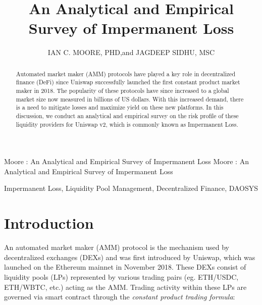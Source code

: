 \documentclass[journal,twocolumn,12pt]{ieeesyscoin}
\begin{document}
\history{}

\title{\centering An Analytical and Empirical Survey of Impermanent Loss}
\author{\centering \uppercase{Ian C. Moore, PhD},and
\uppercase{Jagdeep Sidhu, MSc}}

\address[1]{\centering  Syscoin Researcher, Syscoin Platform (e-mail: imoore@syscoin.org)}
\address[2]{\centering Syscoin Lead Developer, (e-mail: sidhujag@syscoin.org)}
\tfootnote{}

\markboth
{Moore \headeretal: An Analytical and Empirical Survey of Impermanent Loss}
{Moore \headeretal: An Analytical and Empirical Survey of Impermanent Loss}

\corresp{}

\begin{abstract}

Automated market maker (AMM) protocols have played a key role in decentralized finance (DeFi) since Uniswap successfully launched the first constant product market maker in 2018. The popularity of these protocols have since increased to a global market size now measured in billions of US dollars. With this increased demand, there is a need to mitigate losses and maximize yield on these new platforms. In this discussion, we conduct an analytical and empirical survey on the risk profile of these liquidity providers for Uniswap v2, which is commonly known as Impermanent Loss. 

\end{abstract}

\begin{keywords}
Impermanent Loss, Liquidity Pool Management, Decentralized Finance, DAOSYS
\end{keywords}

\titlepgskip=-15pt

\maketitle

\section{Introduction}
\label{sec:introduction}

An automated market maker (AMM) protocol is the mechanism used by decentralized exchanges (DEXs) and was first introduced by Uniswap, which was launched on the Ethereum mainnet in November 2018. These DEXs consist of liquidity pools (LPs) represented by various trading pairs (eg. ETH/USDC, ETH/WBTC, etc.) acting as the AMM. Trading activity within these LPs are governed via smart contract through the \textit{constant product trading formula}:
\end{document}
